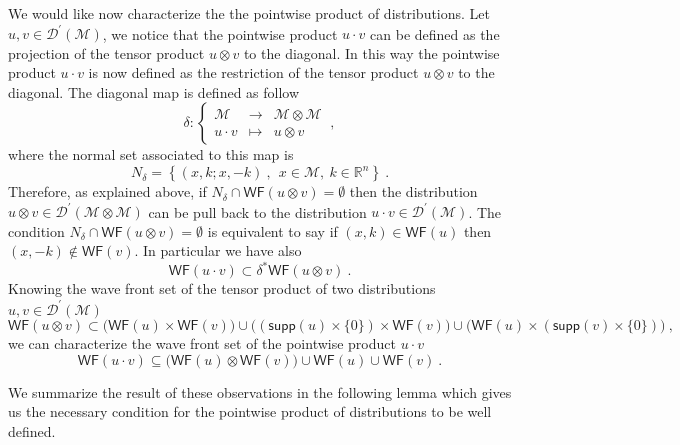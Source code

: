 \documentclass[11pt]{book}
\newcommand{\com}[1]{{\color{red}\bf #1}}
\newcommand{\supp}{\mathsf{supp}}
\newcommand{\WF}{\mathsf{WF}}
\newcommand{\Dcal}{\mathcal{D}}
\newcommand{\Mcal}{\mathcal{M}}
\newcommand{\Rbb}{\mathbb{R}}
\theoremstyle{break}
\begin{document}
We would like now characterize the the pointwise product of distributions. Let $u,v \in \Dcal^\prime(\Mcal)$, we notice that the pointwise product $u \cdot v$ can be defined as the projection of the tensor product $u \otimes v$ to the diagonal. In this way the pointwise product $u \cdot v$ is now defined as the restriction of the tensor product $u \otimes v$ to the diagonal.%
%
%
The diagonal map is defined as follow
%
\begin{equation}
\delta : \left\{
\begin{array}{ccc}
\Mcal & \to & \Mcal \otimes \Mcal \\
u \cdot v & \mapsto & u \otimes v  
\end{array}
\right. \ ,
\label{eq:diag_map}
\end{equation}
%
where the normal set associated to this map is 
%
\begin{equation*}
N_\delta = \left\{ (x,k;x,-k) \ , \ \ x \in \Mcal , \ k \in \Rbb^n \right\} \ .
\end{equation*}
%
Therefore, as explained above, if $N_\delta \cap \WF(u \otimes v) = \emptyset$ then the distribution $u \otimes v \in \Dcal^\prime(\Mcal \otimes \Mcal)$ can be pull back to the distribution $u \cdot v \in \Dcal^\prime(\Mcal)$. The condition $N_\delta \cap \WF(u \otimes v) = \emptyset$ is equivalent to say if $(x,k) \in \WF(u)$ then $(x,-k) \notin \WF(v)$. In particular we have also 
%
\begin{equation*}
\WF(u \cdot v) \subset \delta^\ast \WF(u \otimes v) \ .
\end{equation*}
%
Knowing the wave front set of the tensor product of two distributions $u, v \in\Dcal^\prime(\Mcal)$ 
%
\begin{equation*}
\WF(u \otimes v) \subset 
\bigg( \WF(u) \times \WF(v) \bigg) 
\cup 
\bigg( \left(\supp(u) \times \{0\} \right) \times \WF(v) \bigg) 
\cup 
\bigg( \WF(u) \times \left( \supp(v) \times \{0\} \right) \bigg) \ ,
\end{equation*}
%
we can characterize the wave front set of the pointwise product $u \cdot v$
%
\begin{equation*}
\WF(u \cdot v) \subseteq \bigg( \WF(u) \otimes \WF(v) \bigg) \cup \WF(u) \cup \WF(v) \ . 
\end{equation*} 


We summarize the result of these observations in the following lemma which gives us the necessary condition for the pointwise product of distributions to be well defined. 
\end{document}
